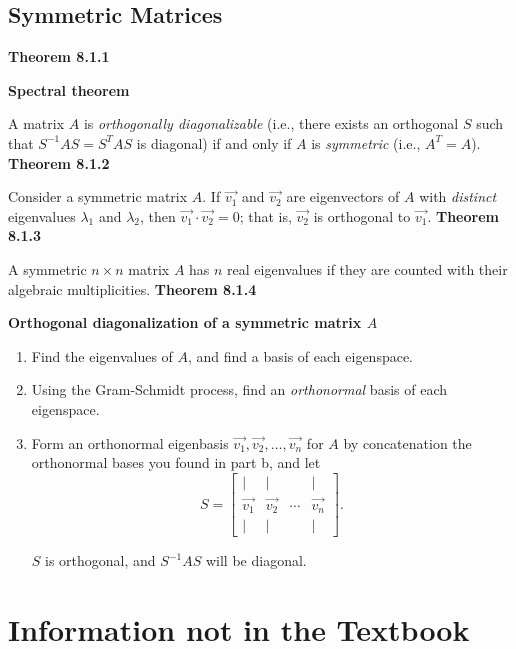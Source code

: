 \subsection{Symmetric Matrices}
\textbf{Theorem 8.1.1}\\
\par\noindent\textbf{Spectral theorem}
\par\noindent A matrix $A$ is \textit{orthogonally diagonalizable} (i.e., there exists an orthogonal $S$ such that $S^{-1}AS=S^{T}AS$ is diagonal) if and only if $A$ is \textit{symmetric} (i.e., $A^{T}=A$).
\textbf{Theorem 8.1.2}\\
\par\noindent Consider a symmetric matrix $A$. If $\vec{v_{1}}$ and $\vec{v_{2}}$ are eigenvectors of $A$ with \textit{distinct} eigenvalues $\lambda{}_{1}$ and $\lambda{}_{2}$, then $\vec{v_{1}}\cdot{}\vec{v_{2}}=0$; that is, $\vec{v_{2}}$ is orthogonal to $\vec{v_{1}}$.
\textbf{Theorem 8.1.3}\\
\par\noindent A symmetric $n\times{}n$ matrix $A$ has $n$ real eigenvalues if they are counted with their algebraic multiplicities.
\textbf{Theorem 8.1.4}\\
\par\noindent\textbf{Orthogonal diagonalization of a symmetric matrix $A$}
\renewcommand{\labelenumi}{\textbf{\alph{enumi}.}}
\begin{enumerate}
\item Find the eigenvalues of $A$, and find a basis of each eigenspace.
\item Using the Gram-Schmidt process, find an \textit{orthonormal} basis of each eigenspace.
\item Form an orthonormal eigenbasis $\vec{v_{1}},\vec{v_{2}},\ldots{},\vec{v_{n}}$ for $A$ by concatenation the orthonormal bases you found in part b, and let
\[S=\left[\begin{array}{cccc}|&|&&|\\{} \vec{v_{1}}&\vec{v_{2}}&\cdots{}&\vec{v_{n}}\\ |&|&&|\end{array}\right].\]
\par\noindent $S$ is orthogonal, and $S^{-1}AS$ will be diagonal.
\end{enumerate}

\section{Information not in the Textbook}
